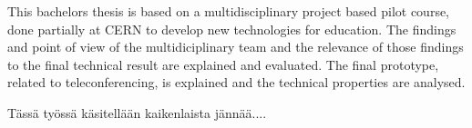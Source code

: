 \documentclass[english,12pt,a4paper,dvips]{article}
\begin{document}


\makecoverpage

\begin{abstractpage}[english]
 This bachelors thesis is based on a multidisciplinary project based pilot course, done partially at CERN to develop new technologies for education. The findings and point of view of the multidiciplinary team and the relevance of those findings to the final technical result are explained and evaluated. The final prototype, related to teleconferencing, is explained and the technical properties are analysed.
 
\end{abstractpage}
\begin{abstractpage}[finnish]
  Tässä työssä käsitellään kaikenlaista jännää....
\end{abstractpage}
\end{document}
